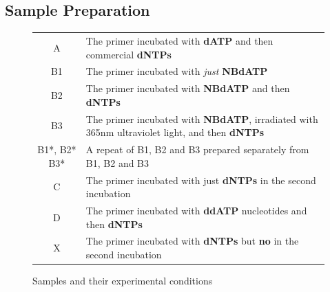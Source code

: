 \documentclass{ssiBio}
\begin{document}
\subsection{Sample Preparation}
\begin{figure}[ht]
\begin{center}
\begin{tabular}{ c | l }
	\hline
	A & The primer incubated with \textbf{dATP} and then commercial \textbf{dNTPs} \\
	B1 & The primer incubated with \textit{just} \textbf{NBdATP} \\
	B2 & The primer incubated with \textbf{NBdATP} and then \textbf{dNTPs}\\
	B3 & The primer incubated with \textbf{NBdATP}, irradiated with 365nm ultraviolet light, and then \textbf{dNTPs}\\
	B1*, B2* B3* & A repeat of B1, B2 and B3 prepared separately from B1, B2 and B3\\
	C & The primer incubated with just \textbf{dNTPs} in the second incubation \\
	D & The primer incubated with \textbf{ddATP} nucleotides and then \textbf{dNTPs} \\
	X & The primer incubated with \textbf{dNTPs} but \textbf{no \tdt{}} in the second incubation \\
	\hline
\end{tabular}
\end{center}
	\label{sampleTable}
	\caption{Samples and their experimental conditions}
\end{figure}
\end{document}
